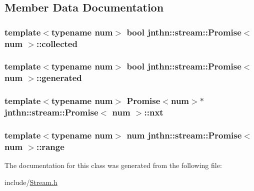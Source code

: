 \subsection{Member Data Documentation}
\hypertarget{classjnthn_1_1stream_1_1Promise_ae1a23ef176aea5eac26c4d79a784b160}{
\subsubsection[{collected}]{\setlength{\rightskip}{0pt plus 5cm}template$<$typename num$>$ bool {\bf jnthn\-::stream\-::\-Promise}$<$ num $>$\-::collected\hspace{0.3cm}{\ttfamily [protected]}}}\label{classjnthn_1_1stream_1_1Promise_ae1a23ef176aea5eac26c4d79a784b160}
\hypertarget{classjnthn_1_1stream_1_1Promise_a6b73728f5d4cbfe7ee23747fd5bcb98d}{
\subsubsection[{generated}]{\setlength{\rightskip}{0pt plus 5cm}template$<$typename num$>$ bool {\bf jnthn\-::stream\-::\-Promise}$<$ num $>$\-::generated\hspace{0.3cm}{\ttfamily [protected]}}}\label{classjnthn_1_1stream_1_1Promise_a6b73728f5d4cbfe7ee23747fd5bcb98d}
\hypertarget{classjnthn_1_1stream_1_1Promise_a8c1da70608dd6397d0d0ad81c2db89e0}{
\subsubsection[{nxt}]{\setlength{\rightskip}{0pt plus 5cm}template$<$typename num$>$ {\bf Promise}$<$num$>$$\ast$ {\bf jnthn\-::stream\-::\-Promise}$<$ num $>$\-::nxt\hspace{0.3cm}{\ttfamily [protected]}}}\label{classjnthn_1_1stream_1_1Promise_a8c1da70608dd6397d0d0ad81c2db89e0}
\hypertarget{classjnthn_1_1stream_1_1Promise_a189ef0405c6ddb48e4c204e242c2116b}{
\subsubsection[{range}]{\setlength{\rightskip}{0pt plus 5cm}template$<$typename num$>$ num {\bf jnthn\-::stream\-::\-Promise}$<$ num $>$\-::range\hspace{0.3cm}{\ttfamily [protected]}}}\label{classjnthn_1_1stream_1_1Promise_a189ef0405c6ddb48e4c204e242c2116b}


The documentation for this class was generated from the following file\-:\begin{DoxyCompactItemize}
\item 
include/\hyperlink{Stream_8h}{Stream.\-h}\end{DoxyCompactItemize}
